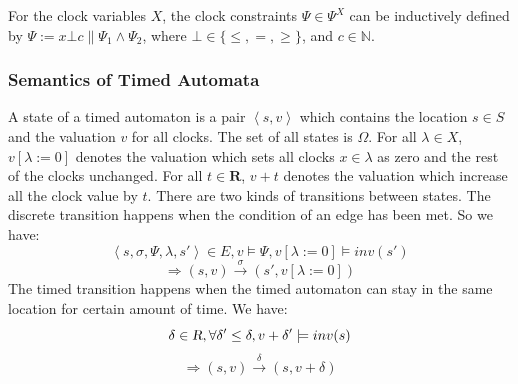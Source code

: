 For the clock variables $X$, the clock constraints $\Psi\in\Psi^X$ can be inductively defined by $\Psi:=x\bot c\|\Psi_1\wedge\Psi_2$, where $\bot\in\{\leq,=,\geq\}$, and $c\in\mathbb{N}$.
\subsubsection{Semantics of Timed Automata}
A state of a timed automaton is a pair $\left\langle s,v\right\rangle$ which contains the location $s\in S$ and the valuation $v$ for all clocks. The set of all states is $\Omega$. For all $\lambda\in X$, $v[\lambda :=0]$ denotes the valuation which sets all clocks $x\in\lambda$ as zero and the rest of the clocks unchanged. For all $t\in \textbf{R}$, $v+t$ denotes the valuation which increase all the clock value by $t$. There are two kinds of transitions between states. The \textsf{discrete transition} happens when the condition of an edge has been met. So we have:
$$\left\langle s,\sigma,\Psi,\lambda,s'\right\rangle\in E,v\models \Psi,v[\lambda :=0]\models inv(s')$$
$$\Rightarrow (s,v)\xrightarrow{\sigma}(s',v[\lambda :=0])$$
The \textsf{timed transition} happens when the timed automaton can stay in the same location for certain amount of time. We have:
$$\delta\in \textsl{R},\forall \delta'\leq\delta, v+\delta'\models inv(s)$$
$$\Rightarrow (s,v)\xrightarrow{\delta}(s,v+\delta)$$
